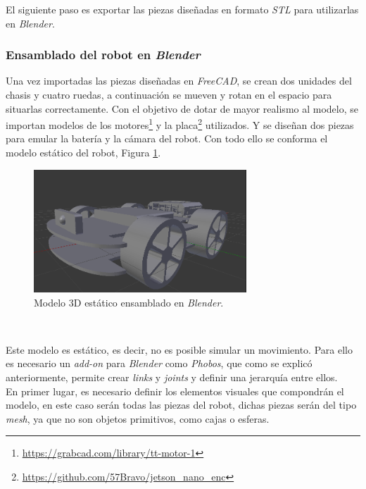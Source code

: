 El siguiente paso es exportar las piezas diseñadas en formato \textit{STL} para utilizarlas en \textit{Blender}.\\

\subsubsection{Ensamblado del robot en \textit{Blender}}

Una vez importadas las piezas diseñadas en \textit{FreeCAD}, se crean dos unidades del chasis y cuatro ruedas, a continuación se mueven y rotan en el espacio para situarlas correctamente. Con el objetivo de dotar de mayor realismo al modelo, se importan modelos de los motores\footnote{\url{https://grabcad.com/library/tt-motor-1}} y la placa\footnote{\url{https://github.com/57Bravo/jetson_nano_enc}} utilizados. Y se diseñan dos piezas para emular la batería y la cámara del robot. Con todo ello se conforma el modelo estático del robot, Figura \ref{fig:blendermodel}.\\

\begin{figure} [h!]
	\begin{center}
		\includegraphics[width=8cm]{figs/blenderModel}
	\end{center}
	\caption{Modelo 3D estático ensamblado en \textit{Blender}.}
	\label{fig:blendermodel}
\end{figure}\

Este modelo es estático, es decir, no es posible simular un movimiento. Para ello es necesario un \textit{add-on} para \textit{Blender} como \textit{Phobos}, que como se explicó anteriormente, permite crear \textit{links} y \textit{joints} y definir una jerarquía entre ellos.\\

En primer lugar, es necesario definir los elementos visuales que compondrán el modelo, en este caso serán todas las piezas del robot, dichas piezas serán del tipo \textit{mesh}, ya que no son objetos primitivos, como cajas o esferas.\\

